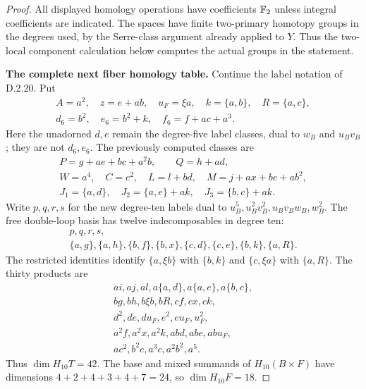 \begin{proof}
All displayed homology operations have coefficients $\mathbb F_2$ unless
integral coefficients are indicated. The spaces have finite
two-primary homotopy groups in the degrees used, by the Serre-class
argument already applied to $Y$. Thus the two-local component
calculation below computes the actual groups in the statement.

\medskip\noindent
\textbf{The complete next fiber homology table.}
Continue the label notation of \textup{D.2.20}. Put
\[
 \begin{gathered}
 A=a^2,\quad z=e+ab,\quad u_F=\xi a,\quad
 k=\{a,b\},\quad R=\{a,c\},\\
 d_6=b^2,\quad e_6=b^2+k,\quad f_6=f+ac+a^3.
 \end{gathered}
 \tag{D.2.22a3}
\]
Here the unadorned $d,e$ remain the degree-five label classes,
dual to $w_B$ and $u_Bv_B$; they are not $d_6,e_6$.
The previously computed classes are
\[
\begin{gathered}
 P=g+ae+bc+a^2b,\qquad Q=h+ad,\\
 W=a^4,\quad C=c^2,\quad L=l+bd,\quad
 M=j+ax+be+ab^2,\\
 J_1=\{a,d\},\quad J_2=\{a,e\}+ak,\quad
 J_3=\{b,c\}+ak.
\end{gathered}
\]
Write $p,q,r,s$ for the new degree-ten labels dual to
$u_B^5,u_B^2v_B^2,u_Bv_Bw_B,w_B^2$.
The free double-loop basis has twelve indecomposables in degree ten:
\[
\begin{gathered}
 p,q,r,s,\\
 \{a,g\},\{a,h\},\{b,f\},\{b,x\},
 \{c,d\},\{c,e\},\{b,k\},\{a,R\}.
\end{gathered}
\]
The restricted identities identify $\{a,\xi b\}$ with $\{b,k\}$
and $\{c,\xi a\}$ with $\{a,R\}$.
The thirty products are
\[
\begin{gathered}
 ai,aj,al,a\{a,d\},a\{a,e\},a\{b,c\},\\
 bg,bh,b\xi b,bR,cf,cx,ck,\\
 d^2,de,du_F,e^2,eu_F,u_F^2,\\
 a^2f,a^2x,a^2k,abd,abe,abu_F,\\
 ac^2,b^2c,a^3c,a^2b^2,a^5.
\end{gathered}
\]
Thus $\dim H_{10}T=42$. The base and mixed summands of
$H_{10}(B\times F)$ have dimensions $4+2+4+3+4+7=24$,
so $\dim H_{10}F=18$.


\end{proof}
